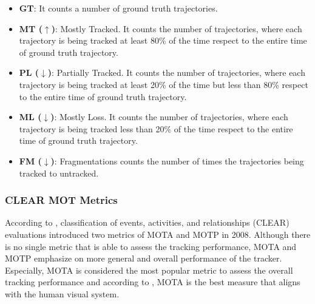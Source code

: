 \begin{itemize}

\item \textbf{GT}: It counts a number of ground truth trajectories.

\item \textbf{MT ($\uparrow$)}: Mostly Tracked. It counts the number of trajectories, where each trajectory is being tracked at least 80\% of the time respect to the entire time of ground truth trajectory.

\item \textbf{PL ($\downarrow$)}: Partially Tracked. It counts the number of trajectories, where each trajectory is being tracked at least 20\% of the time but less than 80\% respect to the entire time of ground truth trajectory.

\item \textbf{ML ($\downarrow$)}: Mostly Loss. It counts the number of trajectories, where each trajectory is being tracked less than 20\% of the time respect to the entire time of ground truth trajectory.

\item \textbf{FM ($\downarrow$)}: Fragmentations counts the number of times the trajectories being tracked to untracked.
\end{itemize}



\subsubsection{CLEAR MOT Metrics}
According to \cite{bernardin_evaluating_2008}, classification of
events, activities, and relationships (CLEAR) evaluations introduced two metrics of MOTA and MOTP in 2008.
Although there is no single metric that is able to assess the tracking performance, MOTA and MOTP emphasize on more general and overall performance of the tracker. Especially, MOTA is considered the most popular metric to assess the overall tracking performance \cite{milan_mot16_2016} and according to \cite{leal-taixe_tracking_2017}, MOTA is the best measure that aligns with the human visual system.

